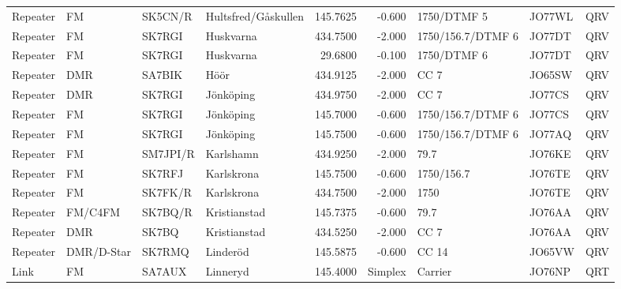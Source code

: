 \begin{landscape}
\begin{longtable}{llllrrlll}
	Repeater          & FM              & SK5CN/R  & Hultsfred/Gåskullen  &     145.7625 &     -0.600 & 1750/DTMF 5       & JO77WL      & QRV      \\
	Repeater          & FM              & SK7RGI   & Huskvarna            &     434.7500 &     -2.000 & 1750/156.7/DTMF 6 & JO77DT      & QRV      \\
	Repeater          & FM              & SK7RGI   & Huskvarna            &      29.6800 &     -0.100 & 1750/DTMF 6       & JO77DT      & QRV      \\
	Repeater          & DMR             & SA7BIK   & Höör                 &     434.9125 &     -2.000 & CC 7              & JO65SW      & QRV      \\
	Repeater          & DMR             & SK7RGI   & Jönköping            &     434.9750 &     -2.000 & CC 7              & JO77CS      & QRV      \\
	Repeater          & FM              & SK7RGI   & Jönköping            &     145.7000 &     -0.600 & 1750/156.7/DTMF 6 & JO77CS      & QRV      \\
	Repeater          & FM              & SK7RGI   & Jönköping            &     145.7500 &     -0.600 & 1750/156.7/DTMF 6 & JO77AQ      & QRV      \\
	Repeater          & FM              & SM7JPI/R & Karlshamn            &     434.9250 &     -2.000 & 79.7              & JO76KE      & QRV      \\
	Repeater          & FM              & SK7RFJ   & Karlskrona           &     145.7500 &     -0.600 & 1750/156.7        & JO76TE      & QRV      \\
	Repeater          & FM              & SK7FK/R  & Karlskrona           &     434.7500 &     -2.000 & 1750              & JO76TE      & QRV      \\
	Repeater          & FM/C4FM         & SK7BQ/R  & Kristianstad         &     145.7375 &     -0.600 & 79.7              & JO76AA      & QRV      \\
	Repeater          & DMR             & SK7BQ    & Kristianstad         &     434.5250 &     -2.000 & CC 7              & JO76AA      & QRV      \\
	Repeater          & DMR/D-Star      & SK7RMQ   & Linderöd             &     145.5875 &     -0.600 & CC 14             & JO65VW      & QRV      \\
	Link              & FM              & SA7AUX   & Linneryd             &     145.4000 &    Simplex & Carrier           & JO76NP      & QRT      \\

\end{longtable}
\end{landscape}
